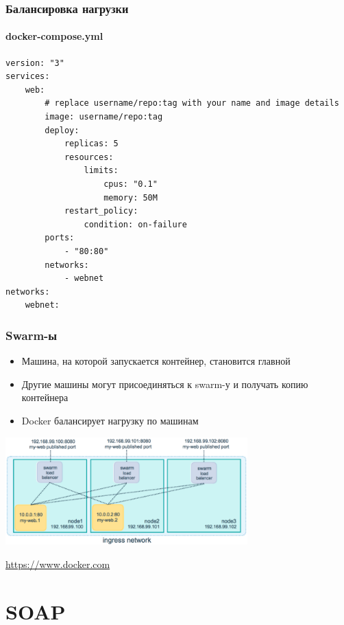 \documentclass[xetex,mathserif,serif]{beamer}
\newcommand{\attribution}[1] {
    \begin{flushright}\begin{scriptsize}\textcolor{gray}{\textcopyright\; #1}\end{scriptsize}\end{flushright}
}
\begin{document}
    \begin{frame}[fragile]
        \frametitle{Балансировка нагрузки}
        \framesubtitle{docker-compose.yml}
        \begin{scriptsize}
            \begin{verbatim}
version: "3"
services:
    web:
        # replace username/repo:tag with your name and image details
        image: username/repo:tag
        deploy:
            replicas: 5
            resources:
                limits:
                    cpus: "0.1"
                    memory: 50M
            restart_policy:
                condition: on-failure
        ports:
            - "80:80"
        networks:
            - webnet
networks:
    webnet:
            \end{verbatim}
        \end{scriptsize}
    \end{frame}

    \begin{frame}
        \frametitle{Swarm-ы}
        \begin{itemize}
            \item Машина, на которой запускается контейнер, становится главной
            \item Другие машины могут присоединяться к swarm-у и получать копию контейнера
            \item Docker балансирует нагрузку по машинам
        \end{itemize}
        \begin{center}
            \includegraphics[width=0.7\textwidth]{swarmLoadBalancing.png}
            \attribution{\url{https://www.docker.com}}
        \end{center}
    \end{frame}

    \section{SOAP}
\end{document}
